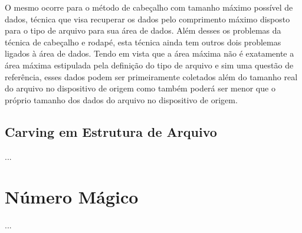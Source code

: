 O mesmo ocorre para o método de cabeçalho com tamanho máximo possível de dados, técnica que visa recuperar os dados pelo comprimento máximo disposto para o tipo de arquivo para sua área de dados. Além desses os problemas da técnica de cabeçalho e rodapé, esta técnica ainda tem outros dois problemas ligados à área de dados. Tendo em vista que a área máxima não é exatamente a área máxima estipulada pela definição do tipo de arquivo e sim uma questão de referência, esses dados podem ser primeiramente coletados além do tamanho real do arquivo no dispositivo de origem como também poderá ser menor que o próprio tamanho dos dados do arquivo no dispositivo de origem.

\subsection{Carving em Estrutura de Arquivo}
...

\section{Número Mágico}
...